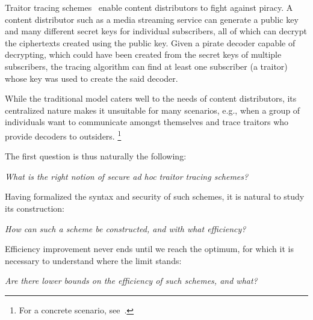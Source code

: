 Traitor tracing schemes~\cite{C:ChoFiaNao94} enable content distributors to fight against piracy.
A content distributor such as a media streaming service can generate a public key and many different secret keys for individual subscribers,
all of which can decrypt the ciphertexts created using the public key.
Given a pirate decoder capable of decrypting,
which could have been created from the secret keys of multiple subscribers,
the tracing algorithm can find at least one subscriber (a traitor) whose key was used to create the said decoder.

While the traditional model caters well to the needs of content distributors,
its centralized nature makes it unsuitable for many scenarios,
e.g., when a group of individuals want to communicate amongst themselves and trace traitors who provide decoders to outsiders.%
\footnote{For a concrete scenario, see~\cite{C:Zhandry21}.}

The first question is thus naturally the following:
\begin{center}
\itshape
What is the right notion of secure ad hoc traitor tracing schemes?\\
\end{center}
Having formalized the syntax and security of such schemes,
it is natural to study its construction:
\begin{center}
\itshape
How can such a scheme be constructed, and with what efficiency?
\end{center}
Efficiency improvement never ends until we reach the optimum,
for which it is necessary to understand where the limit stands:
\begin{center}
\itshape
Are there lower bounds on the efficiency of such schemes, and what?
\end{center}
